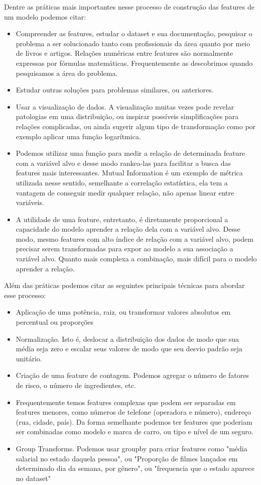 \documentclass{article}
\begin{document}
Dentre as práticas mais importantes nesse processo de construção das features de um modelo podemos citar:
\begin{itemize}
\item Compreender as features, estudar o dataset e sua documentação, pesquisar o problema a ser solucionado tanto com profissionais da área quanto por meio de livros e artigos. Relações numéricas entre features são normalmente expressas por fórmulas matemáticas. Frequentemente as descobrimos quando pesquisamos a área do problema.
\item Estudar outras soluções para problemas similares, ou anteriores.
\item Usar a visualização de dados. A visualização muitas vezes pode revelar patologias em uma distribuição, ou inspirar possíveis simplificações para relações complicadas, ou ainda sugerir algum tipo de transformação como por exemplo aplicar uma função logarítmica. 
\item Podemos utilizar uma função para medir a relação de determinada feature com a variável alvo e desse modo rankea-las para facilitar a busca das  features mais interessantes. Mutual Information é um exemplo de métrica utilizada nesse sentido, semelhante a correlação estatística, ela tem a vantagem de conseguir medir qualquer relação, não apenas linear entre variáveis. 
\item A utilidade de uma feature, entretanto, é diretamente proporcional a capacidade do modelo aprender a relação dela com a variável alvo. Desse modo, mesmo features com alto índice de relação com a variável alvo, podem precisar serem transformadas para expor ao modelo a sua associação a variável alvo. Quanto mais complexa a combinação, mais difícil para o modelo aprender a relação.
\end{itemize}

Além das práticas podemos citar as seguintes principais técnicas para abordar esse processo:
\begin{itemize}
\item Aplicação de uma potência, raiz, ou transformar valores absolutos em percentual ou proporções
\item Normalização. Isto é, deslocar a distribuição dos dados de modo que sua média seja zero e escalar seus valores de modo que seu desvio padrão seja unitário. 
\item Criação de uma feature de contagem. Podemos agregar o número de fatores de risco, o número de ingredientes, etc.
\item Frequentemente temos features complexas que podem ser separadas em features menores, como números de telefone (operadora e número), endereço (rua, cidade, país). Da forma semelhante podemos ter features que poderiam ser combinadas como modelo e marca de carro, ou tipo e nível de um seguro.
\item Group Transforms. Podemos usar groupby para criar features como "média salarial no estado daquela pessoa", ou "Proporção de filmes lançados em determinado dia da semana, por gênero", ou "frequencia que o estado aparece no dataset"
\end{itemize}
\end{document}
